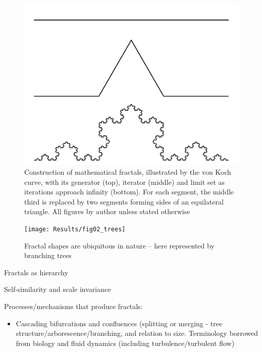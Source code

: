 \documentclass[
  12pt,
  a4paper, twoside]{book}
\providecommand{\tightlist}{%
  \setlength{\itemsep}{0pt}\setlength{\parskip}{0pt}}
\begin{document}
\begin{figure}

{\centering \includegraphics[width=0.9\linewidth]{bookdown-demo_files/figure-latex/02-koch-1} 

}

\caption[The von Koch curve]{Construction of mathematical fractals, illustrated by the von Koch curve, with its generator (top), iterator (middle) and limit set as iterations approach infinity (bottom). For each segment, the middle third is replaced by two segments forming sides of an equilateral triangle. All figures by author unless stated otherwise}\label{fig:02-koch}
\end{figure}



\begin{figure}

{\centering \texttt{[image: Results/fig02\_trees]} 

}

\caption[Trees as example of fractal shapes in nature]{Fractal shapes are ubiquitous in nature -- here represented by branching trees}\label{fig:02-trees}
\end{figure}

Fractals as hierarchy

Self-similarity and scale invariance

Processes/mechanisms that produce fractals:

\begin{itemize}
\tightlist
\item
  Cascading bifurcations and confluences (splitting or merging - tree structure/arborescence/branching, and relation to size. Terminology borrowed from biology and fluid dynamics (including turbulence/turbulent flow)
\end{itemize}
\end{document}
